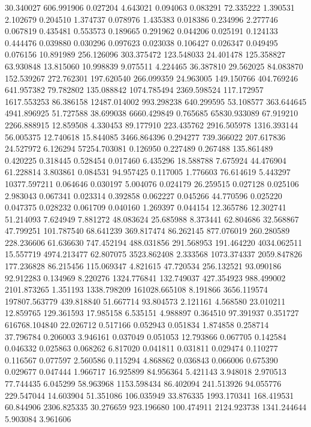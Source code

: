 30.340027
606.991906
0.027204
4.643021
0.094063
0.083291
72.335222
1.390531
2.102679
0.204510
1.374737
0.078976
1.435383
0.018386
0.234996
2.277746
0.067819
0.435481
0.553573
0.189665
0.291962
0.044206
0.025191
0.124133
0.444476
0.039880
0.030296
0.097623
0.023038
0.106427
0.026347
0.049495
0.076156
10.891989
256.126096
303.375472
123.548033
24.401478
125.358827
63.930848
13.815060
10.998839
9.075511
4.224465
36.387810
29.562025
84.083870
152.539267
272.762301
197.620540
266.099359
24.963005
149.150766
404.769246
641.957382
79.782802
135.088842
1074.785494
2369.598524
117.172957
1617.553253
86.386158
12487.014002
993.298238
640.299595
53.108577
363.644645
4941.896925
51.727588
38.699038
6660.429849
0.765685
65830.933089
67.919210
2266.888915
12.859508
4.330453
89.177910
223.435762
2916.505978
1316.393144
56.005375
12.740618
15.844085
3466.864396
0.294277
739.366022
207.617836
24.527972
6.126294
57254.703081
0.126950
0.227489
0.267488
135.861489
0.420225
0.318445
0.528454
0.017460
6.435296
18.588788
7.675924
44.476904
61.228814
3.803861
0.084531
94.957425
0.117005
1.776603
76.614619
5.443297
10377.597211
0.064646
0.030197
5.004076
0.024179
26.259515
0.027128
0.025106
2.983043
0.067341
0.023314
0.392858
0.062227
0.045266
44.770596
0.025220
0.047375
0.028232
0.061709
0.040160
1.269397
0.044154
12.365786
12.302741
51.214093
7.624949
7.881272
48.083624
25.685988
8.373441
62.804686
32.568867
47.799251
101.787540
68.641239
369.817474
86.262145
877.076019
260.280589
228.236606
61.636630
747.452194
488.031856
291.568953
191.464220
4034.062511
15.557719
4974.213477
62.807075
3523.862408
2.333568
1073.374337
2059.847826
177.236828
86.215456
115.069347
4.821615
47.720534
256.132521
93.090186
92.912283
0.134969
8.220276
1324.776841
132.749037
427.354923
988.499002
2101.873265
1.351193
1338.798209
161028.665108
8.191866
3656.119574
197807.563779
439.818840
51.667714
93.804573
2.121161
4.568580
23.010211
12.859765
129.361593
17.985158
6.535151
4.988897
0.364510
97.391937
0.351727
616768.104840
22.026712
0.517166
0.052943
0.051834
1.874858
0.258714
37.796784
0.206003
3.946161
0.037049
0.051053
12.793866
0.067705
0.142584
0.046332
0.025863
0.068262
6.817020
0.041811
0.031811
0.029474
0.110277
0.116567
0.077597
2.560586
0.115294
4.868862
0.036843
0.066006
0.675390
0.029677
0.047444
1.966717
16.925899
84.956364
5.421143
3.948018
2.970513
77.744435
6.045299
58.963968
1153.598434
86.402094
241.513926
94.055776
229.547044
14.603904
51.351086
106.035949
33.876335
1993.170341
168.419531
60.844906
2306.825335
30.276659
923.196680
100.474911
2124.923738
1341.244644
5.903084
3.961606
